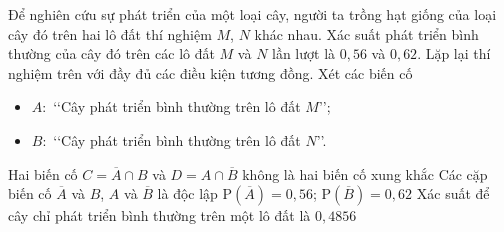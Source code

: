 \begin{ex}%
	Để nghiên cứu sự phát triển của một loại cây, người ta trồng hạt giống của loại cây đó trên hai lô đất thí nghiệm $M$, $N$ khác nhau. Xác suất phát triển bình thường của cây đó trên các lô đất $M$ và $N$ lần lượt là $0{,}56$ và $0{,}62$. Lặp lại thí nghiệm trên với đầy đủ các điều kiện tương đồng. Xét các biến cố
	\begin{itemize}
		\item $A\colon$ \lq\lq Cây phát triển bình thường trên lô đất $M$\rq\rq;
		\item $B\colon$ \lq\lq Cây phát triển bình thường trên lô đất $N$\rq\rq.
	\end{itemize}
	\choiceTF
	{Hai biến cố $C=\overline{A} \cap B$ và $D=A \cap \overline{B}$ không là hai biến cố xung khắc}
	{\True Các cặp biến cố $\overline{A}$ và $B$, $A$ và $\overline{B}$ là độc lập}
	{$\mathrm{P}(\overline{A})=0{,}56$; $\mathrm{P}(\overline{B})=0{,}62$}
	{\True Xác suất để cây chỉ phát triển bình thường trên một lô đất là $0{,}4856$}
\end{ex}

